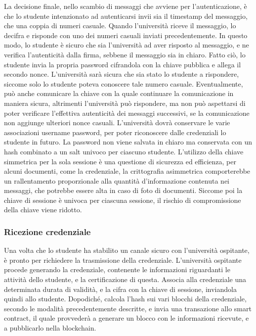 \documentclass[a4paper,12pt]{article}
\begin{document}
\newline La decisione finale, nello scambio di messaggi che avviene per l'autenticazione, è che lo studente intenzionato ad autenticarsi invii sia il timestamp del messaggio, che una coppia di numeri casuale. Quando l'università riceve il messaggio, lo decifra e risponde con uno dei numeri casuali inviati precedentemente. In questo modo, lo studente è sicuro che sia l'università ad aver risposto al messaggio, e ne verifica l'autenticità dalla firma, sebbene il messaggio sia in chiaro. Fatto ciò, lo studente invia la propria password cifrandola con la chiave pubblica e allega il secondo nonce. L'università sarà sicura che sia stato lo studente a rispondere, siccome solo lo studente poteva conoscere tale numero casuale. Eventualmente, può anche comunicare la chiave con la quale continuare la comunicazione in maniera sicura, altrimenti l'università può rispondere, ma non può aspettarsi di poter verificare l'effettiva autenticità dei messaggi successivi, se la comunicazione non aggiunge ulteriori nonce casuali.
\newline L'università dovrà conservare le varie associazioni username password, per poter riconoscere dalle credenziali lo studente in futuro. La password non viene salvata in chiaro ma conservata con un hash combinato a un salt univoco per ciascuno studente.
\newline L'utilizzo della chiave simmetrica per la sola sessione è una questione di sicurezza ed efficienza, per alcuni documenti, come la credenziale, la crittografia asimmetrica comporterebbe un rallentamento proporzionale alla quantità d'informazione contenuta nei messaggi, che potrebbe essere alta in caso di foto di documenti. Siccome poi la chiave di sessione è univoca per ciascuna sessione, il rischio di compromissione della chiave viene ridotto.
\subsubsection{Ricezione credenziale}
Una volta che lo studente ha stabilito un canale sicuro con l'università ospitante, è pronto per richiedere la trasmissione della credenziale. L'università ospitante procede generando la credenziale, contenente le informazioni riguardanti le attività dello studente, e la certificazione di questa. Associa alla credenziale una determinata durata di validità, e la cifra con la chiave di sessione, inviandola quindi allo studente. Dopodiché, calcola l'hash sui vari blocchi della credenziale, secondo le modalità precedentemente descritte, e invia una transazione allo smart contract, il quale provvederà a generare un blocco con le informazioni ricevute, e a pubblicarlo nella blockchain.
\end{document}
